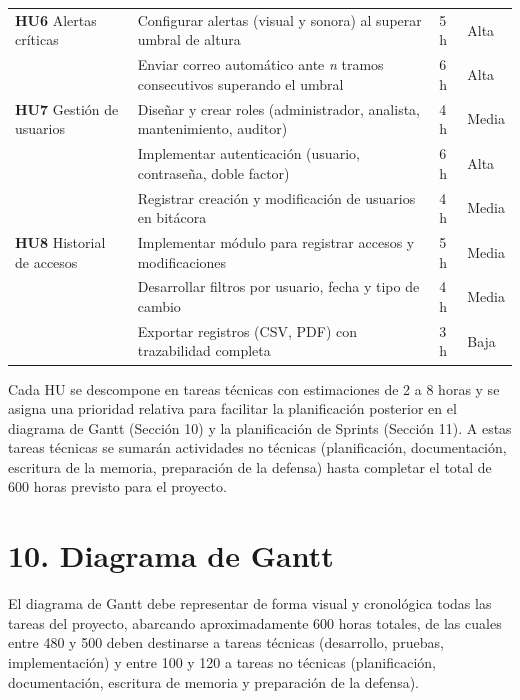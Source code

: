\documentclass[
11pt, %
]{ProyectoVpC}
\begin{document}
\begin{table}[ht]
\begin{tabular}{@{}p{4.6cm} p{6cm} p{2cm} p{2.2cm}@{}}
\textbf{HU6} Alertas críticas
  & Configurar alertas (visual y sonora) al superar umbral de altura 
  & 5 h  
  & Alta \\

  & Enviar correo automático ante \emph{n} tramos consecutivos superando el umbral 
  & 6 h  
  & Alta \\
\midrule

\textbf{HU7} Gestión de usuarios
  & Diseñar y crear roles (administrador, analista, mantenimiento, auditor) 
  & 4 h  
  & Media \\

  & Implementar autenticación (usuario, contraseña, doble factor) 
  & 6 h  
  & Alta \\

  & Registrar creación y modificación de usuarios en bitácora 
  & 4 h  
  & Media \\
\midrule

\textbf{HU8} Historial de accesos
  & Implementar módulo para registrar accesos y modificaciones 
  & 5 h  
  & Media \\

  & Desarrollar filtros por usuario, fecha y tipo de cambio 
  & 4 h  
  & Media \\

  & Exportar registros (CSV, PDF) con trazabilidad completa 
  & 3 h  
  & Baja \\

\bottomrule
\end{tabular}
\end{table}

\noindent
Cada HU se descompone en tareas técnicas con estimaciones de 2 a 8 horas y se asigna una prioridad relativa para facilitar la planificación posterior en el diagrama de Gantt (Sección 10) y la planificación de Sprints (Sección 11). A estas tareas técnicas se sumarán actividades no técnicas (planificación, documentación, escritura de la memoria, preparación de la defensa) hasta completar el total de 600 horas previsto para el proyecto.

\section{10. Diagrama de Gantt}
\label{sec:gantt}

El diagrama de Gantt debe representar de forma visual y cronológica todas las tareas del proyecto, abarcando aproximadamente 600 horas totales, de las cuales entre 480 y 500 deben destinarse a tareas técnicas (desarrollo, pruebas, implementación) y entre 100 y 120 a tareas no técnicas (planificación, documentación, escritura de memoria y preparación de la defensa).
\end{document}

